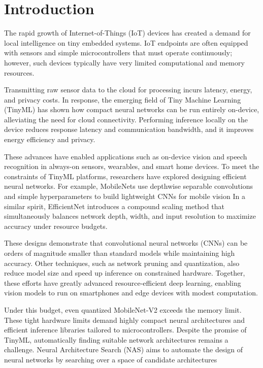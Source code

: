 \chapter{Introduction}
The rapid growth of Internet-of-Things (IoT) devices has created a demand for local intelligence on tiny embedded systems. IoT endpoints are often equipped with sensors and simple microcontrollers that must operate continuously; however, such devices typically have very limited computational and memory resources.

Transmitting raw sensor data to the cloud for processing incurs latency, energy, and privacy costs. In response, the emerging field of Tiny Machine Learning (TinyML) has shown how compact neural networks can be run entirely on-device, alleviating the need for cloud connectivity. Performing inference locally on the device reduces response latency and communication bandwidth, and it improves energy efficiency and privacy.\cite{alajlan2022tinyml}

These advances have enabled applications such as on-device vision and speech recognition in always-on sensors, wearables, and smart home devices. To meet the constraints of TinyML platforms, researchers have explored designing efficient neural networks. For example, MobileNets use depthwise separable convolutions and simple hyperparameters to build lightweight CNNs for mobile vision
\cite{ConvNetworks-MobileNets} 
In a similar spirit, EfficientNet introduces a compound scaling method that simultaneously balances network depth, width, and input resolution to maximize accuracy under resource budgets. \cite{tan2019efficientnet}

These designs demonstrate that convolutional neural networks (CNNs) can be orders of magnitude smaller than standard models while maintaining high accuracy. Other techniques, such as network pruning and quantization, also reduce model size and speed up inference on constrained hardware. Together, these efforts have greatly advanced resource-efficient deep learning, enabling vision models to run on smartphones and edge devices with modest computation.


Under this budget, even quantized MobileNet-V2 exceeds the memory limit. These tight hardware limits demand highly compact neural architectures and efficient inference libraries tailored to microcontrollers. Despite the promise of TinyML, automatically finding suitable network architectures remains a challenge. Neural Architecture Search (NAS) aims to automate the design of neural networks by searching over a space of candidate architectures
 \cite{liu2022survey}

